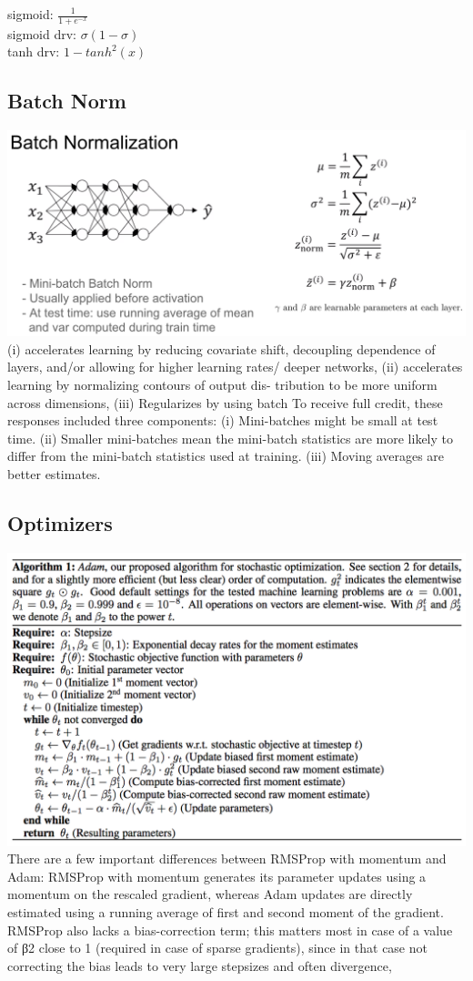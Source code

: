 sigmoid: $\frac{1}{1+e^{-x}}$
\\
sigmoid drv: $\sigma(1-\sigma)$
\\
tanh drv: $1-tanh^2(x)$

\subsection*{Batch Norm}
\includegraphics[width=\linewidth]{batchnorm.png}
(i) accelerates learning by reducing covariate shift, decoupling dependence of layers, and/or allowing for higher learning rates/ deeper networks, (ii) accelerates learning by normalizing contours of output dis- tribution to be more uniform across dimensions, (iii) Regularizes by using batch
To receive full credit, these responses included three components: (i) Mini-batches might be small at test time. (ii) Smaller mini-batches mean the mini-batch statistics are more likely to differ from the mini-batch statistics used at training. (iii) Moving averages are better estimates.

\subsection*{Optimizers}
\includegraphics[width=\linewidth]{adam.png}
There are a few important differences between RMSProp with momentum and Adam: RMSProp with momentum generates its parameter updates using a momentum on the rescaled gradient, whereas Adam updates are
directly estimated using a running average of first and second moment of the gradient. RMSProp
also lacks a bias-correction term; this matters most in case of a value of β2 close to 1 (required in
case of sparse gradients), since in that case not correcting the bias leads to very large stepsizes and
often divergence,

